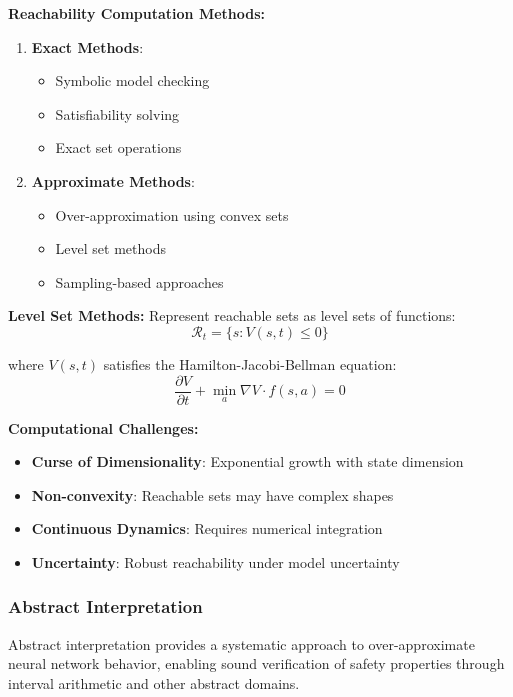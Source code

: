 \documentclass[12pt]{article}
\begin{document}
{{{{\textbf{Reachability Computation Methods:}
\begin{enumerate}
\item \textbf{Exact Methods}: 
\begin{itemize}
\item Symbolic model checking
\item Satisfiability solving
\item Exact set operations
\end{itemize}

\item \textbf{Approximate Methods}:
\begin{itemize}
\item Over-approximation using convex sets
\item Level set methods
\item Sampling-based approaches
\end{itemize}
\end{enumerate}

\textbf{Level Set Methods:}
Represent reachable sets as level sets of functions:
\begin{equation}
\mathcal{R}_t = \{s : V(s,t) \leq 0\}
\end{equation}

where $V(s,t)$ satisfies the Hamilton-Jacobi-Bellman equation:
\begin{equation}
\frac{\partial V}{\partial t} + \min_{a} \nabla V \cdot f(s,a) = 0
\end{equation}

\textbf{Computational Challenges:}
\begin{itemize}
\item \textbf{Curse of Dimensionality}: Exponential growth with state dimension
\item \textbf{Non-convexity}: Reachable sets may have complex shapes
\item \textbf{Continuous Dynamics}: Requires numerical integration
\item \textbf{Uncertainty}: Robust reachability under model uncertainty
\end{itemize}

\subsubsection{Abstract Interpretation}

Abstract interpretation provides a systematic approach to over-approximate neural network behavior, enabling sound verification of safety properties through interval arithmetic and other abstract domains.

}}}}
\end{document}
